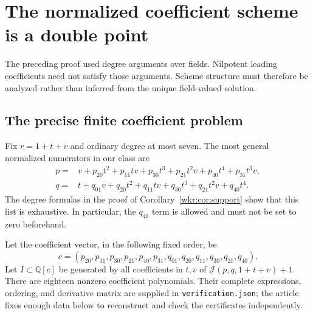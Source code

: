 \documentclass[11pt,a4paper]{article}
\numberwithin{equation}{section}
\theoremstyle{definition}
\theoremstyle{remark}
\newcommand{\Q}{\mathbb{Q}}
\newcommand{\J}{\mathcal{J}}
\begin{document}
\section{The normalized coefficient scheme is a double point}
\label{wkr:sec:scheme}

The preceding proof used degree arguments over fields. Nilpotent leading
coefficients need not satisfy those arguments. Scheme structure must
therefore be analyzed rather than inferred from the unique field-valued
solution.

\subsection{The precise finite coefficient problem}

Fix $r=1+t+v$ and ordinary degree at most seven. The most general normalized
numerators in our class are
\begin{align}
p={}&v+p_{20}t^2+p_{11}tv+p_{30}t^3+p_{21}t^2v
       +p_{40}t^4+p_{31}t^3v,\label{wkr:eq:scheme-p}\\
q={}&t+q_{01}v+q_{20}t^2+q_{11}tv+q_{30}t^3
       +q_{21}t^2v+q_{40}t^4.\label{wkr:eq:scheme-q}
\end{align}
The degree formulas in the proof of Corollary~\ref{wkr:cor:support} show that
this list is exhaustive. In particular, the $q_{40}$ term is allowed and
must not be set to zero beforehand.

Let the coefficient vector, in the following fixed order, be
\begin{equation}\label{wkr:eq:coordorder}
c=(p_{20},p_{11},p_{30},p_{21},p_{40},p_{31},
       q_{01},q_{20},q_{11},q_{30},q_{21},q_{40}).
\end{equation}
Let $I\subset\Q[c]$ be generated by all coefficients in $t,v$ of
$\J(p,q,1+t+v)+1$. There are eighteen nonzero coefficient polynomials.
Their complete expressions, ordering, and derivative matrix are supplied
in \texttt{verification.json}; the article fixes enough data below to
reconstruct and check the certificates independently.
\end{document}
